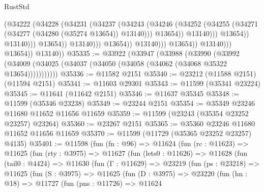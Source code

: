 \begin{lexlean}{RustStd}
\begin{coremodule}
                                                (@34222
                                                  (@34228
                                                    (@34231
                                                      (@34237
                                                        (@34243
                                                          (@34246
                                                            (@34252
                                                              (@34255
                                                                (@34271
                                                                  (@34277
                                                                    (@34280 (@35274 @13654))
                                                                    @13140)))
                                                              @13654))
                                                          @13140)))
                                                    @13654))
                                                @13140)))
                                          @13654))
                                      @13140)))
                                @13654))
                            @13140)))
                      @13654))
                  @13140)))
            @13654))
        @13140))
@35335 := @33922
    (@33947
      (@33988
        (@33990
          (@33992 (@34009 (@34025 (@34037 (@34050 (@34058 (@34062 (@34068 @35322 @13654)))))))))))
@35336 := @11582 @2151
@35340 := @23212 (@11588 @2151) (@11594 @2151)
@35341 := @11603 @29301
@35343 := @11599 (@35341 @23224)
@35345 := @11641 (@11642 @2151)
@35346 := @11637 @35345
@35348 := @11599 (@35346 @23238)
@35349 := @23244 @2151
@35354 := @35349 @23246 @11680 @11652 @11656 @11659
@35359 := @11599 (@23243 (@35354 @23252 @23257) @23264)
@35360 := @23267 @2151
@35365 := @35360 @23246 @11680 @11652 @11656 @11659
@35370 := @11599 (@11729 (@35365 @23252 @23257) @4135)
@35401 := @11598
    (fun (fn : @96) =>
    @11624
      (fun (rc : @11623) =>
      @11625
        (fun (rty : @3975) =>
        @11627
          (fun (lets0 : @11626) =>
          @11628
            (fun (tail0 : @4424) =>
            @11630
              (fun (Γ : @11629) =>
              @23219
                (fun (ps : @23218) =>
                @11625
                  (fun (S : @3975) =>
                  @11625
                    (fun (D : @3975) =>
                    @23220
                      (fun (hn : @18) =>
                      @11727
                        (fun (pns : @11726) =>
                        @11624

\end{coremodule}
\end{lexlean}
